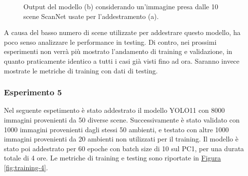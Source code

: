 \documentclass[12pt]{report}
\begin{document}
\begin{figure}[h!]
	\centering
	\hspace{0.01\textwidth}
	\hspace{0.01\textwidth}
	\caption{Output del modello (b) considerando un'immagine presa dalle 10 scene ScanNet usate per l'addestramento (a).}
	\label{fig:prediction-2}
\end{figure}

A causa del basso numero di scene utilizzate per addestrare questo modello, ha poco senso analizzare le performance in testing. Di contro, nei prossimi esperimenti non verrà più mostrato l'andamento di training e validazione, in quanto praticamente identico a tutti i casi già visti fino ad ora. Saranno invece mostrate le metriche di training con dati di testing.

\subsubsection{Esperimento 5}
\label{sec:esperimento_5}

Nel seguente espetimento è stato addestrato il modello YOLO11 con 8000 immagini provenienti da 50 diverse scene. Successivamente è stato validato con 1000 immagini provenienti dagli stessi 50 ambienti, e testato con altre 1000 immagini provenienti da 20 ambienti non utilizzati per il training. Il modello è stato poi addestrato per 60 epoche con batch size di 10 sul PC1, per una durata totale di 4 ore. Le metriche di training e testing sono riportate in \hyperref[fig:training-4]{Figura \ref{fig:training-4}}.
\end{document}

